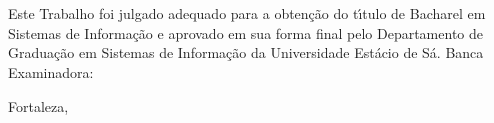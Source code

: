 \thispagestyle{empty}%

\begin{center}
    \textsc{\nomeautor}\\
     \vspace{1.5cm} \textbf{\titulo}     \\
\end{center}

   \vspace{1.0cm}
    Este Trabalho foi julgado adequado para a obten\c{c}{\~a}o do t\'{\i}tulo de Bacharel em Sistemas de Informação e aprovado em sua forma final pelo Departamento de Gradua\c{c}\~{a}o em Sistemas de Informação da Universidade Estácio de Sá.
    \assinatura{\nomeautor}
     \vspace{1.0cm}
     Banca Examinadora:
     \assinatura{\nomeorientador \\Orientadora}
     \assinatura{\nomebancaA}
     \assinatura{\nomebancaB}
     \vspace{0.75cm}%

\begin{center}
    {\normalsize    Fortaleza, \datacompleta}
\end{center}
